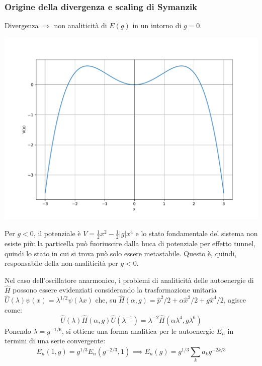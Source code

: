 \documentclass[10pt]{beamer}
\begin{document}
  \begin{frame}
\frametitle{Origine della divergenza e scaling di Symanzik}

  Divergenza $\Rightarrow $ non analiticit\`a di $E(g)$ in un intorno di $g=0$. 
  \begin{minipage}{0.45\textwidth}
    	\centering
    	\includegraphics[width=\columnwidth]{f1.pdf}
  \end{minipage}%
  \hfill
  \begin{minipage}{0.5\textwidth}
Per $g<0$, il potenziale \`e $V= \frac{1}{2}x^2 - \frac{1}{2}\lvert g \rvert x^4$ e lo stato fondamentale del sistema non esiste pi\`u: la particella pu\`o fuoriuscire dalla buca di potenziale per effetto tunnel, quindi lo stato in cui si trova pu\`o solo essere metastabile.
Questo \`e, quindi, responsabile della non-analiticit\`a per $g<0$.
  \end{minipage}
{\hspace{2cm}}
  Nel caso dell'oscillatore anarmonico, i problemi di analiticit\`a delle autoenergie di $\hat{H}$ possono essere evidenziati considerando la trasformazione unitaria $\hat{U}(\lambda ) \psi (x) = \lambda ^{1 / 2} \psi (\lambda x)$ che, su $\hat{H}(\alpha ,g) = \hat{p}^2 / 2 + \alpha  \hat{x}^2 / 2 + g \hat{x}^4 / 2$, agisce come:
  \begin{equation*}
  	\hat{U}(\lambda ) \hat{H}(\alpha ,g) \hat{U}(\lambda ^{-1} ) = \lambda ^{-2} \hat{H}(\alpha  \lambda ^4, g \lambda ^6)
  \end{equation*}
Ponendo $\lambda  = g^{- 1 / 6} $, si ottiene una forma analitica per le autoenergie $E_n$ in termini di una serie convergente:
  \[
  E_n(1,g) = g^{1 / 3} E_n(g^{-2 / 3} , 1) \implies E_n(g) = g^{1 /3 }  \sum_{k}^{} a_k g^{-2k/3}
\] 
  \end{frame} 
\end{document}

